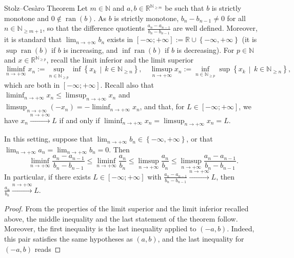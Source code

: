 \begin{appendixitem}{Stolz–Cesàro Theorem}
    Let \( m \in \mathbb{N} \) and \( a, b \in \mathbb{R}^{\mathbb{N}_{\geq m}} \) be such that \( b \) is strictly monotone and \( 0 \notin \operatorname{ran}\left(b\right) \). As \( b \) is strictly monotone, \( b_n-b_{n-1} \neq 0 \) for all \( n \in \mathbb{N}_{\geq m+1} \), so that the difference quotients \( \frac{a_n-a_{n-1}}{b_n-b_{n-1}} \) are well defined. Moreover, it is standard that \( \lim_{n \to +\infty} b_n \) exists in \( \left[-\infty;+\infty\right] := \mathbb{R} \cup \left\{-\infty, +\infty\right\} \) (it is \( \sup \operatorname{ran}\left(b\right) \) if \( b \) is increasing, and \( \inf \operatorname{ran}\left(b\right) \) if \( b \) is decreasing). For \( p \in \mathbb{N} \) and \( x \in \mathbb{R}^{\mathbb{N}_{\geq p}} \), recall the limit inferior and the limit superior
    \[
        \liminf_{n \to +\infty} x_n := \sup_{n \in \mathbb{N}_{\geq p}} \inf\left\{ x_k \,\middle|\, k \in \mathbb{N}_{\geq n} \right\}, \quad \limsup_{n \to +\infty} x_n := \inf_{n \in \mathbb{N}_{\geq p}} \sup\left\{ x_k \,\middle|\, k \in \mathbb{N}_{\geq n} \right\},
    \]
    which are both in \( \left[-\infty;+\infty\right] \). Recall also that \( \liminf_{n \to +\infty} x_n \leq \limsup_{n \to +\infty} x_n \) and \( \limsup_{n \to +\infty} \left(-x_n\right) = -\liminf_{n \to +\infty} x_n \), and that, for \( L \in \left[-\infty;+\infty\right] \), we have \( x_n \overset{n \to +\infty}{\longrightarrow} L \) if and only if \( \liminf_{n \to +\infty} x_n = \limsup_{n \to +\infty} x_n = L \).
    \begin{theorem}
        In this setting, suppose that \( \lim_{n \to +\infty} b_n \in \left\{-\infty, +\infty\right\} \), or that \( \lim_{n \to +\infty} a_n = \lim_{n \to +\infty} b_n = 0 \). Then
        \[
            \liminf_{n \to +\infty} \frac{a_n-a_{n-1}}{b_n-b_{n-1}} \leq \liminf_{n \to +\infty} \frac{a_n}{b_n} \leq \limsup_{n \to +\infty} \frac{a_n}{b_n} \leq \limsup_{n \to +\infty} \frac{a_n-a_{n-1}}{b_n-b_{n-1}}.
        \]
        In particular, if there exists \( L \in \left[-\infty;+\infty\right] \) with \( \frac{a_n-a_{n-1}}{b_n-b_{n-1}} \overset{n \to +\infty}{\longrightarrow} L \), then \( \frac{a_n}{b_n} \overset{n \to +\infty}{\longrightarrow} L \).
    \end{theorem}
    \begin{proof}
        From the properties of the limit superior and the limit inferior recalled above, the middle inequality and the last statement of the theorem follow. Moreover, the first inequality is the last inequality applied to \( \left(-a, b\right) \). Indeed, this pair satisfies the same hypotheses as \( \left(a, b\right) \), and the last inequality for \( \left(-a, b\right) \) reads

\end{proof}
\end{appendixitem}
